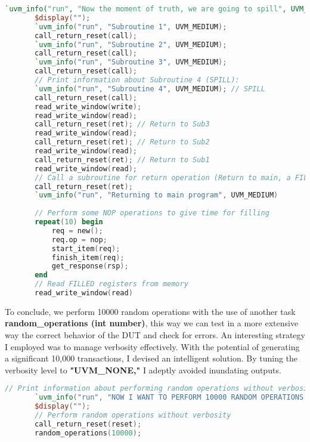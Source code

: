 \documentclass[12pt,a4paper]{report}
\begin{document}
\vspace{0.3cm}
\begin{lstlisting}[language=Verilog, caption= SPILL and FILL test sequence, label=lst:sysverilog]
`uvm_info("run", "Now the moment of truth, we are going to spill", UVM_HIGH);
       $display("");
       `uvm_info("run", "Subroutine 1", UVM_MEDIUM);
       call_return_reset(call);
       `uvm_info("run", "Subroutine 2", UVM_MEDIUM);
       call_return_reset(call);
       `uvm_info("run", "Subroutine 3", UVM_MEDIUM);
       call_return_reset(call);
       // Print information about Subroutine 4 (SPILL):
       `uvm_info("run", "Subroutine 4", UVM_MEDIUM); // SPILL
       call_return_reset(call);
       read_write_window(write);
       read_write_window(read);
       call_return_reset(ret); // Return to Sub3
       read_write_window(read); 
       call_return_reset(ret); // Return to Sub2
       read_write_window(read);
       call_return_reset(ret); // Return to Sub1
       read_write_window(read);
       // Call a subroutine for return operation (Return to main, a FILL will be performed)
       call_return_reset(ret);
       `uvm_info("run", "Returning to main program", UVM_MEDIUM)
     
       // Perform some NOP operations to give time for filling
       repeat(10) begin
           req = new();
           req.op = nop;
           start_item(req);
           finish_item(req);
           get_response(rsp);
       end
       // Read FILLED registers from memory
       read_write_window(read)
\end{lstlisting}
\vspace{0.3cm}
To conclude, we perform 10000 random operations with the use of another task \textbf{random\_operations (int number)}, this way we can test in a more extensive way the correct behavior of the DUT and check for errors. An interesting strategy I employed was to manage verbosity effectively. With the potential of generating a significant 10,000 transactions, I devised an intelligent solution. By tuning the verbosity level to \textbf{"UVM\_NONE,"} I adeptly avoided inundating outputs. 
\vspace{0.3cm}
\begin{lstlisting}[language=Verilog, caption= Final 10000 random operations to expand Coverage (No verbosity), label=lst:sysverilog]
       // Print information about performing random operations without verbosity
       `uvm_info("run", "NOW I WANT TO PERFORM 10000 RANDOM OPERATIONS WITHOUT VERBOSITY::::::::::", UVM_MEDIUM);
       $display("");
       // Perform random operations without verbosity
       call_return_reset(reset);
       random_operations(10000);

\end{lstlisting}
\vspace{0.3cm}
\end{document}
